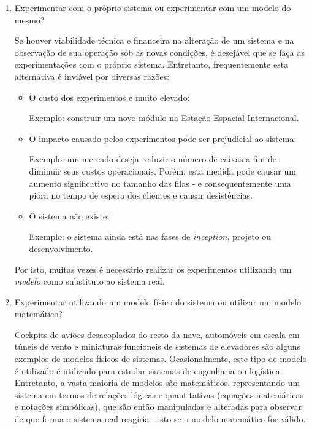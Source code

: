 \begin{enumerate}
\item Experimentar com o próprio sistema ou experimentar com um modelo do mesmo?

Se houver viabilidade técnica e financeira na alteração de um sistema e na
observação de sua operação sob as novas condições, é desejável que se faça as
experimentações com o próprio sistema. Entretanto, frequentemente esta
alternativa é inviável por diversas razões:

\begin{itemize}
  \item O custo dos experimentos é muito elevado:

  Exemplo: construir um novo módulo na Estação Espacial Internacional.

  \item O impacto causado pelos experimentos pode ser prejudicial ao sistema:

  Exemplo: um mercado deseja reduzir o número de caixas a fim de diminuir seus
custos operacionais. Porém, esta medida pode causar um aumento significativo no
tamanho das filas - e consequentemente uma piora no tempo de espera dos clientes
e causar desistências.

  \item O sistema não existe:

  Exemplo: o sistema ainda está nas fases de \textit{inception}, projeto ou
  desenvolvimento.
\end{itemize}

Por isto, muitas vezes é necessário realizar os experimentos utilizando um
\textit{modelo} como substituto ao sistema real.

\item Experimentar utilizando um modelo físico do sistema ou utilizar um modelo
matemático?

Cockpits de aviões desacoplados do resto da nave, automóveis em escala em túneis
de vento e miniaturas funcioneis de sistemas de elevadores são alguns exemplos
de modelos físicos de sistemas. Ocasionalmente, este tipo de modelo é utilizado
é utilizado para estudar sistemas de engenharia ou logística \cite{Law}.
Entretanto, a vasta maioria de modelos são matemáticos, representando um sistema
em termos de relações lógicas e quantitativas (equações matemáticas e notações
simbólicas), que são então manipuladas e alteradas para observar de que forma o
sistema real reagiria - isto se o modelo matemático for válido.


\end{enumerate}
